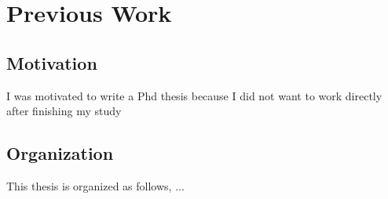 \chapter{Previous Work}
\section{Motivation}
I was motivated to write a Phd thesis because I did not want to work directly after finishing my study
\section{Organization}
This thesis is organized as follows, ...